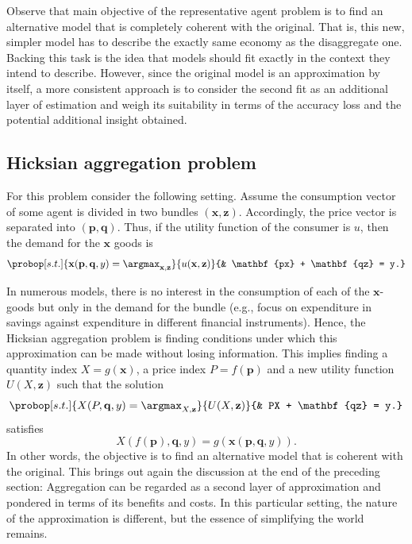 \documentclass[english, a4paper, 12pt]{article}
\begin{document}
Observe that main objective of the representative agent problem is to find an alternative model that is completely coherent with the original. That is, this new, simpler model has to describe the exactly same economy as the disaggregate one. Backing this task is the idea that models should fit exactly in the context they intend to describe. However, since the original model is an approximation by itself, a more consistent approach is to consider the second fit as an additional layer of estimation and weigh its suitability in terms of the accuracy loss and the potential additional insight obtained.

\subsection{Hicksian aggregation problem} \label{ssec:HicksAgg}
For this problem consider the following setting. Assume the consumption vector of some agent is divided in two bundles $(\mathbf{x}, \mathbf{z})$. Accordingly, the price vector is separated into $(\mathbf{p}, \mathbf{q})$. Thus, if the utility function of the consumer is $u$, then the demand for the $\mathbf{x}$ goods is
	\begin{equation} \label{eq:hickdisprob}
		\probop[s.t.]{\mathbf{x}(\mathbf{p}, \mathbf{q}, y) = \argmax_{\mathbf{x}, \mathbf{z}}}{u(\mathbf{x}, \mathbf{z})}
					{&	\mathbf{px} + \mathbf{qz} = y.}
	\end{equation}

In numerous models, there is no interest in the consumption of each of the $\mathbf{x}$-goods but only in the demand for the bundle (e.g., focus on expenditure in savings against expenditure in different financial instruments). Hence, the Hicksian aggregation problem is finding conditions under which this approximation can be made without losing information. This implies finding a quantity index $X = g(\mathbf{x})$, a price index $P = f(\mathbf{p})$ and a new utility function $U(X, \mathbf{z})$ such that the solution
	 \begin{equation} \label{eq:hickaggprob}
		\probop[s.t.]{X(P, \mathbf{q}, y) = \argmax_{X, \mathbf{z}}}{U(X, \mathbf{z})}
					{&	PX + \mathbf{qz} = y.}
	\end{equation}
satisfies
	$$X(f(\mathbf{p}), \mathbf{q}, y) = g(\mathbf{x}(\mathbf{p}, \mathbf{q}, y)).$$
In other words, the objective is to find an alternative model that is coherent with the original. This brings out again the discussion at the end of the preceding section: Aggregation can be regarded as a second layer of approximation and pondered in terms of its benefits and costs. In this particular setting, the nature of the approximation is different, but the essence of simplifying the world remains.
\end{document}
